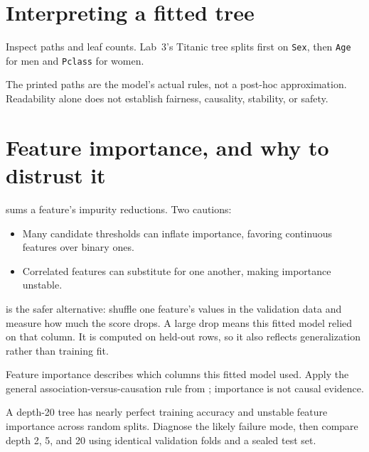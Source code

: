 \section{Interpreting a fitted tree}

Inspect paths and leaf counts. Lab~3's Titanic tree splits first on \texttt{Sex}, then \texttt{Age} for men and \texttt{Pclass} for women.

\begin{keyidea}
The printed paths are the model's actual rules, not a post-hoc approximation. Readability alone does not establish fairness, causality, stability, or safety.
\end{keyidea}

\section{Feature importance, and why to distrust it}
\label{sec:tree-feature-importance}

 sums a feature's impurity reductions. Two cautions:

\begin{itemize}
  \item Many candidate thresholds can inflate importance, favoring continuous features over binary ones.
  \item Correlated features can substitute for one another, making importance unstable.
\end{itemize}

 is the safer alternative: shuffle one feature's values in the validation data and measure how much the score drops. A large drop means this fitted model relied on that column. It is computed on held-out rows, so it also reflects generalization rather than training fit.

\begin{keyidea}
Feature importance describes which columns this fitted model used. Apply the general association-versus-causation rule from ; importance is not causal evidence.
\end{keyidea}

\begin{debugtask}
A depth-20 tree has nearly perfect training accuracy and unstable feature importance across random splits. Diagnose the likely failure mode, then compare depth 2, 5, and 20 using identical validation folds and a sealed test set.
\end{debugtask}

